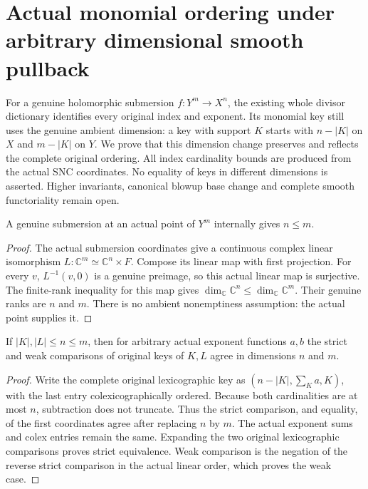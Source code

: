 \section{Actual monomial ordering under arbitrary dimensional smooth pullback}

For a genuine holomorphic submersion $f:Y^m\to X^n$, the existing whole
divisor dictionary identifies every original index and exponent. Its
monomial key still uses the genuine ambient dimension: a key with support
$K$ starts with $n-|K|$ on $X$ and $m-|K|$ on $Y$. We prove that this
dimension change preserves and reflects the complete original ordering.
All index cardinality bounds are produced from the actual SNC coordinates.
No equality of keys in different dimensions is asserted. Higher invariants,
canonical blowup base change and complete smooth functoriality remain open.

\begin{lemma}
\label{hir:submersion-monomial-dimension}
A genuine submersion at an actual point of $Y^m$ internally gives $n\le m$.
\leanok
\end{lemma}
\begin{proof}
The actual submersion coordinates give a continuous complex linear
isomorphism $L:\mathbb C^m\simeq\mathbb C^n\times F$. Compose its linear
map with first projection. For every $v$, $L^{-1}(v,0)$ is a genuine
preimage, so this actual linear map is surjective. The finite-rank
inequality for this map gives $\dim_{\mathbb C}\mathbb C^n\le
\dim_{\mathbb C}\mathbb C^m$. Their genuine ranks are $n$ and $m$.
There is no ambient nonemptiness assumption: the actual point supplies it.
\end{proof}

\begin{lemma}
\label{hir:submersion-monomial-key-order}
If $|K|,|L|\le n\le m$, then for arbitrary actual exponent functions $a,b$
the strict and weak comparisons of original keys of $K,L$ agree in
dimensions $n$ and $m$.
\leanok
\end{lemma}
\begin{proof}
Write the complete original lexicographic key as
$(n-|K|,\sum_Ka,K)$, with the last entry colexicographically ordered.
Because both cardinalities are at most $n$, subtraction does not truncate.
Thus the strict comparison, and equality, of the first coordinates agree
after replacing $n$ by $m$. The actual exponent sums and colex entries
remain the same. Expanding the two original lexicographic comparisons
proves strict equivalence. Weak comparison is the negation of the reverse
strict comparison in the actual linear order, which proves the weak case.
\end{proof}

